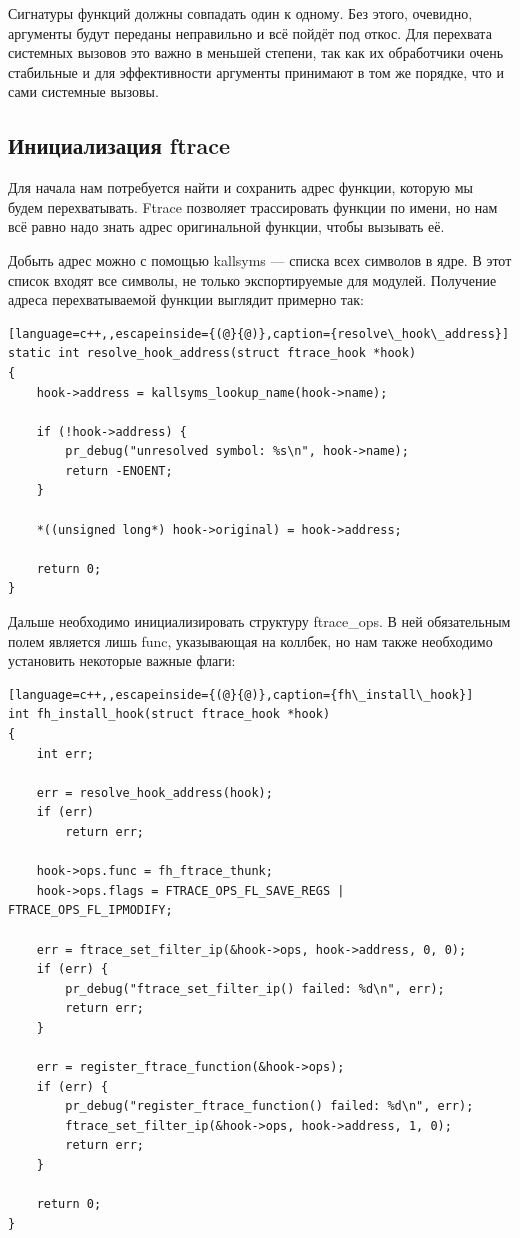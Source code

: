 Сигнатуры функций должны совпадать один к одному. Без этого, очевидно, аргументы будут переданы неправильно и всё пойдёт под откос. Для перехвата системных вызовов это важно в меньшей степени, так как их обработчики очень стабильные и для эффективности аргументы принимают в том же порядке, что и сами системные вызовы.

\subsection{Инициализация ftrace}
Для начала нам потребуется найти и сохранить адрес функции, которую мы будем перехватывать. Ftrace позволяет трассировать функции по имени, но нам всё равно надо знать адрес оригинальной функции, чтобы вызывать её.

Добыть адрес можно с помощью kallsyms — списка всех символов в ядре. В этот список входят все символы, не только экспортируемые для модулей. Получение адреса перехватываемой функции выглядит примерно так:
\begin{lstlisting}[language=c++,,escapeinside={(@}{@)},caption={resolve\_hook\_address}]
static int resolve_hook_address(struct ftrace_hook *hook)
{
	hook->address = kallsyms_lookup_name(hook->name);

	if (!hook->address) {
		pr_debug("unresolved symbol: %s\n", hook->name);
		return -ENOENT;
	}

	*((unsigned long*) hook->original) = hook->address;

	return 0;
}
\end{lstlisting}

Дальше необходимо инициализировать структуру ftrace\_ops. В ней обязательным полем является лишь func, указывающая на коллбек, но нам также необходимо установить некоторые важные флаги:
\begin{lstlisting}[language=c++,,escapeinside={(@}{@)},caption={fh\_install\_hook}]
int fh_install_hook(struct ftrace_hook *hook)
{
	int err;
	
	err = resolve_hook_address(hook);
	if (err)
		return err;
	
	hook->ops.func = fh_ftrace_thunk;
	hook->ops.flags = FTRACE_OPS_FL_SAVE_REGS | FTRACE_OPS_FL_IPMODIFY;
	
	err = ftrace_set_filter_ip(&hook->ops, hook->address, 0, 0);
	if (err) {
		pr_debug("ftrace_set_filter_ip() failed: %d\n", err);
		return err;
	}
	
	err = register_ftrace_function(&hook->ops);
	if (err) {
		pr_debug("register_ftrace_function() failed: %d\n", err);
		ftrace_set_filter_ip(&hook->ops, hook->address, 1, 0);
		return err;
	}
	
	return 0;
}
\end{lstlisting}

